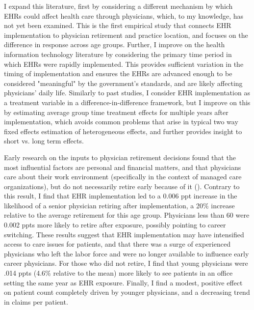 \documentclass[12pt]{article}
\begin{document}
I expand this literature, first by considering a different mechanism by which EHRs could affect health care through physicians, which, to my knowledge, has not yet been examined. This is the first empirical study that connects EHR implementation to physician retirement and practice location, and focuses on the difference in response across age groups. Further, I improve on the health information technology literature by considering the primary time period in which EHRs were rapidly implemented. This provides sufficient variation in the timing of implementation and ensures the EHRs are advanced enough to be considered "meaningful" by the government's standards, and are likely affecting physicians' daily life. Similarly to past studies, I consider EHR implementation as a treatment variable in a difference-in-difference framework, but I improve on this by estimating average group time treatment effects for multiple years after implementation, which avoids common problems that arise in typical two way fixed effects estimation of heterogeneous effects, and further provides insight to short vs. long term effects.  

Early research on the inputs to physician retirement decisions found that the most influential factors are personal and financial matters, and that physicians care about their work environment (specifically in the context of managed care organizations), but do not necessarily retire early because of it (\cite{Bahrami2002}). Contrary to this result, I find that EHR implementation led to a 0.006 ppt increase in the likelihood of a senior physician retiring after implementation, a 20\% increase relative to the average retirement for this age group. Physicians less than 60 were 0.002 ppts more likely to retire after exposure, possibly pointing to career switching. These results suggest that EHR implementation may have intensified access to care issues for patients, and that there was a surge of experienced physicians who left the labor force and were no longer available to influence early career physicians. For those who did not retire, I find that young physicians were .014 ppts (4.6\% relative to the mean) more likely to see patients in an office setting the same year as EHR exposure.  Finally, I find a modest, positive effect on patient count completely driven by younger physicians, and a decreasing trend in claims per patient.
\end{document}
